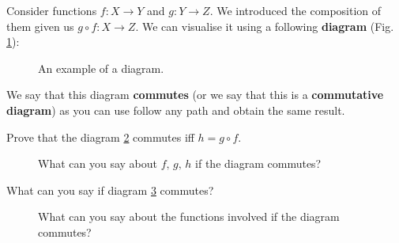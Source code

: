 Consider functions $f:X\to Y$ and $g:Y\to Z$. We introduced the composition of them given us $g\circ f: X\to Z$. We can visualise it using a following \textbf{diagram} (Fig. \ref{fig:commutative_diagram_intro}):

\begin{figure}
  \centering
  \caption{An example of a diagram.}
  \label{fig:commutative_diagram_intro}
\end{figure}

We say that this diagram \textbf{commutes} (or we say that this is a \textbf{commutative diagram}) as you can use follow any path and obtain the same result.

\begin{exercise}
  Prove that the diagram \ref{fig:commutative_diagram_composition} commutes iff $h=g\circ f$.

  \begin{figure}
    \centering

    \caption{What can you say about $f,\,g,\,h$ if the diagram commutes?}
    \label{fig:commutative_diagram_composition}
  \end{figure}
\end{exercise}

\begin{exercise}
  What can you say if diagram \ref{fig:commutative_diagram_toy_natural_transformation} commutes?

  \begin{figure}
    \centering

    \caption{What can you say about the functions involved if the diagram commutes?}
    \label{fig:commutative_diagram_toy_natural_transformation}
  \end{figure}
\end{exercise}
